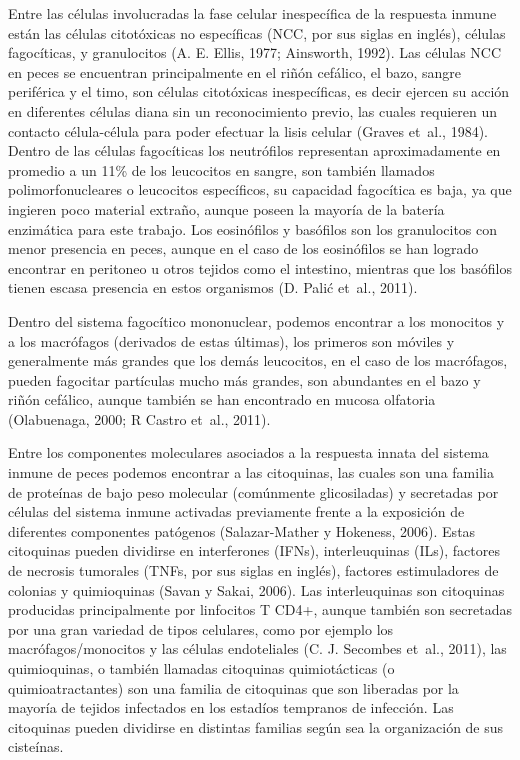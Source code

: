 \documentclass[12pt,letterpaper,oneside]{scrbook}
\begin{document}
Entre las células involucradas la fase celular inespecífica de la
respuesta inmune están las células citotóxicas no específicas (NCC, por
sus siglas en inglés), células fagocíticas, y granulocitos (A. E. Ellis,
1977; Ainsworth, 1992). Las células NCC en peces se encuentran
principalmente en el riñón cefálico, el bazo, sangre periférica y el
timo, son células citotóxicas inespecíficas, es decir ejercen su acción
en diferentes células diana sin un reconocimiento previo, las cuales
requieren un contacto célula-célula para poder efectuar la lisis celular
(Graves et~al., 1984). Dentro de las células fagocíticas los neutrófilos
representan aproximadamente en promedio a un 11\% de los leucocitos en
sangre, son también llamados polimorfonucleares o leucocitos
específicos, su capacidad fagocítica es baja, ya que ingieren poco
material extraño, aunque poseen la mayoría de la batería enzimática para
este trabajo. Los eosinófilos y basófilos son los granulocitos con menor
presencia en peces, aunque en el caso de los eosinófilos se han logrado
encontrar en peritoneo u otros tejidos como el intestino, mientras que
los basófilos tienen escasa presencia en estos organismos (D. Palić
et~al., 2011).

Dentro del sistema fagocítico mononuclear, podemos encontrar a los
monocitos y a los macrófagos (derivados de estas últimas), los primeros
son móviles y generalmente más grandes que los demás leucocitos, en el
caso de los macrófagos, pueden fagocitar partículas mucho más grandes,
son abundantes en el bazo y riñón cefálico, aunque también se han
encontrado en mucosa olfatoria (Olabuenaga, 2000; R Castro et~al.,
2011).

Entre los componentes moleculares asociados a la respuesta innata del
sistema inmune de peces podemos encontrar a las citoquinas, las cuales
son una familia de proteínas de bajo peso molecular (comúnmente
glicosiladas) y secretadas por células del sistema inmune activadas
previamente frente a la exposición de diferentes componentes patógenos
(Salazar-Mather y Hokeness, 2006)⁠. Estas citoquinas pueden dividirse en
interferones (IFNs), interleuquinas (ILs), factores de necrosis
tumorales (TNFs, por sus siglas en inglés), factores estimuladores de
colonias y quimioquinas (Savan y Sakai, 2006)⁠. Las interleuquinas son
citoquinas producidas principalmente por linfocitos T CD4+, aunque
también son secretadas por una gran variedad de tipos celulares, como
por ejemplo los macrófagos/monocitos y las células endoteliales (C. J.
Secombes et~al., 2011), las quimioquinas, o también llamadas citoquinas
quimiotácticas (o quimioatractantes) son una familia de citoquinas que
son liberadas por la mayoría de tejidos infectados en los estadíos
tempranos de infección. Las citoquinas pueden dividirse en distintas
familias según sea la organización de sus cisteínas.
\end{document}
